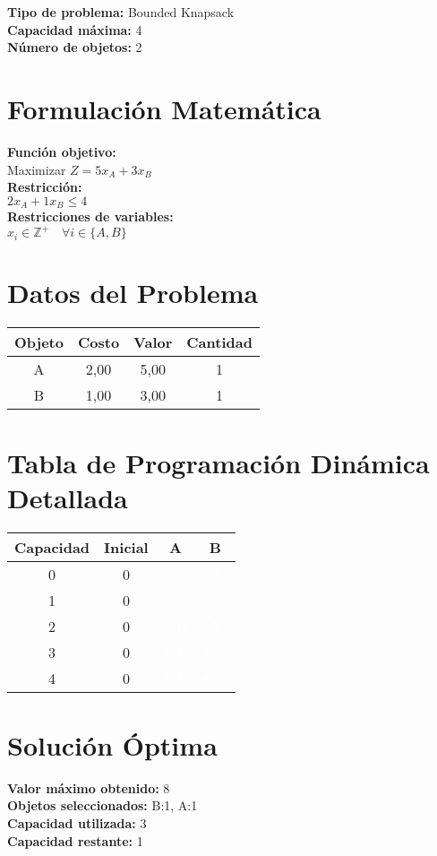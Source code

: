 \documentclass{article}
\begin{document}
\thispagestyle{empty}
\newpage
\textbf{Tipo de problema:} Bounded Knapsack\\
\textbf{Capacidad máxima:} 4\\
\textbf{Número de objetos:} 2\\

\section*{Formulación Matemática}
\textbf{Función objetivo:}\\
Maximizar $Z = 5 x_{A} + 3 x_{B}$\\

\textbf{Restricción:}\\
$2 x_{A} + 1 x_{B} \leq 4$\\

\textbf{Restricciones de variables:}\\
$x_i \in \mathbb{Z}^+ \quad \forall i \in \{A, B\}$\\
\vspace{0.5cm}

\section*{Datos del Problema}
\begin{tabular}{|c|c|c|c|}
\hline
Objeto & Costo & Valor & Cantidad \\
\hline
A & 2,00 & 5,00 & 1 \\
B & 1,00 & 3,00 & 1 \\
\hline
\end{tabular}

\section*{Tabla de Programación Dinámica Detallada}
\begin{center}
\scriptsize
\begin{tabular}{|c|c|c|c|}
\hline
Capacidad & Inicial & A & B \\ \hline
0 & 0 & \cellcolor{rojo}\textcolor{white}{0} & \cellcolor{rojo}\textcolor{white}{0} \\ \hline
1 & 0 & \cellcolor{rojo}\textcolor{white}{0} & \cellcolor{verde}\textcolor{white}{3(1)} \\ \hline
2 & 0 & \cellcolor{verde}\textcolor{white}{5(1)} & \cellcolor{rojo}\textcolor{white}{5} \\ \hline
3 & 0 & \cellcolor{verde}\textcolor{white}{5(1)} & \cellcolor{verde}\textcolor{white}{8(1)} \\ \hline
4 & 0 & \cellcolor{verde}\textcolor{white}{5(1)} & \cellcolor{verde}\textcolor{white}{8(1)} \\ \hline
\end{tabular}
\end{center}
\normalsize

\section*{Solución Óptima}
\textbf{Valor máximo obtenido:} 8\\
\textbf{Objetos seleccionados:} B:1, A:1\\
\textbf{Capacidad utilizada:} 3\\
\textbf{Capacidad restante:} 1\\
\end{document}
